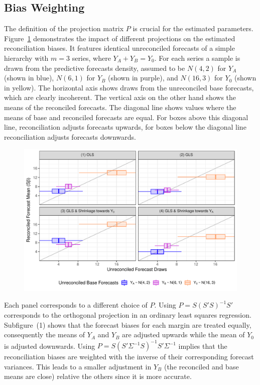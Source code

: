 \documentclass[a4paper,fleqn,11pt]{article}
\begin{document}
\subsection{Bias Weighting}\label{sec:weighting}

The definition of the projection matrix $P$ is crucial for the estimated parameters. Figure~\ref{fig:weights} demonstrates the impact of different projections on the estimated reconciliation biases. It features identical unreconciled forecasts of a simple hierarchy with $m=3$ series, where $Y_A + Y_B = Y_0$. For each series a sample is drawn from the predictive forecasts density, assumed to be $N(4,2)$ for $Y_A$ (shown in blue), $N(6,1)$ for $Y_B$ (shown in purple), and $N(16,3)$ for $Y_0$ (shown in yellow). The horizontal axis shows draws from the unreconciled base forecasts, which are clearly incoherent. The vertical axis on the other hand shows the means of the reconciled forecasts. The diagonal line shows values where the means of base and reconciled forecasts are equal. For boxes above this diagonal line, reconciliation adjusts forecasts upwards, for boxes below the diagonal line reconciliation adjusts forecasts downwards.

\begin{figure}[H]
	\includegraphics[width=\textwidth]{fig/fig_biases}
	\label{fig:weights}
\end{figure}

Each panel corresponds to a different choice of $P$. Using $P = S(S'S)^{-1}S'$ corresponds to the orthogonal projection in an ordinary least squares regression. Subfigure~(1) shows that the forecast biases for each margin are treated equally, consequently the means of $Y_A$ and $Y_B$ are adjusted upwards while the mean of $Y_0$ is adjusted downwards. Using $P = S(S'\Sigma^{-1}S)^{-1}S'\Sigma^{-1}$ implies that the reconciliation biases are weighted with the inverse of their corresponding forecast variances. This leads to a smaller adjustment in $Y_B$ (the reconciled and base means are close) relative the others since it is more accurate.
\end{document}
